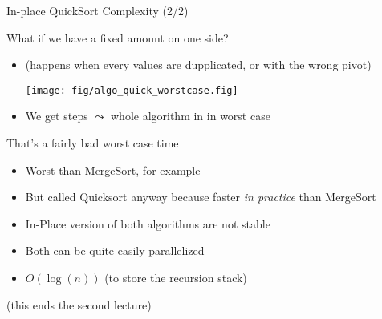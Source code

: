 \begin{frame}{In-place QuickSort Complexity (2/2)}
  \begin{block}{What if we have a fixed amount on one side?}
    \begin{itemize}
    \item (happens when every values are dupplicated, or with the wrong pivot)

    \centerline{
      \texttt{[image: fig/algo\_quick\_worstcase.fig]}
    }
    \item We get  steps 
      $\leadsto$ whole algorithm in  in worst case
    \end{itemize}    
  \end{block}\vspace{-.4\baselineskip}

  \begin{block}{That's a fairly bad worst case time}
    \begin{itemize}
    \item Worst than MergeSort, for example
    \item But called Quicksort anyway because faster \textit{in practice}
      than MergeSort%
    \item In-Place version of both algorithms are \alert{not stable}
    \item Both can be quite easily parallelized
    \item {}
      $O(\log(n))$ (to store the recursion stack)
    \end{itemize}
  \end{block}\vspace{-\baselineskip}

  \begin{flushright}
    (this ends the second lecture)    
  \end{flushright}
\end{frame}

